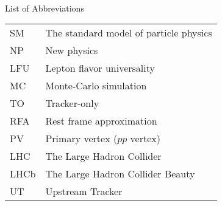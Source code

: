 \singlespacing \normalsize
\hbox{\ }

\vspace{.5in}

\begin{center}
\large{List of Abbreviations}
\end{center}

\vspace{3pt}

\begin{supertabular}{ll}
    SM    & The standard model of particle physics \\
    NP    & New physics \\
    LFU   & Lepton flavor universality \\
    MC    & Monte-Carlo simulation \\
    TO    & Tracker-only \\
    RFA   & Rest frame approximation \\
    PV    & Primary vertex ($pp$ vertex) \\
    LHC   & The Large Hadron Collider \\
    LHCb  & The Large Hadron Collider Beauty \\
    UT    & Upstream Tracker \\
\end{supertabular}

